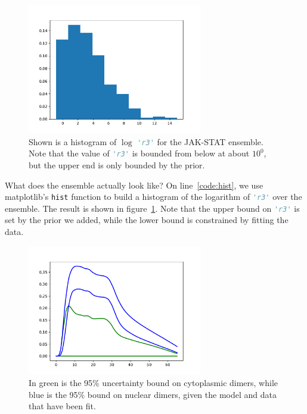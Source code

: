 \documentclass[12pt]{article}
\makeatletter
\newcommand{\py}[1]{\lstinline[language=Python, showstringspaces=False]@#1@}
\makeatother
\begin{document}
\begin{figure}
\begin{center}
\includegraphics[width=3in]{../../Example/JAK-STAT/hist}
\end{center}
\caption[Histogram of $\log$ \py{'r3'} for the JAK-STAT model]{Shown is a histogram of $\log$ \py{'r3'} for the JAK-STAT ensemble. Note that the value of \py{'r3'} is bounded from below at about $10^0$, but the upper end is only bounded by the prior.\label{fig:user:hist}}
\end{figure}

What does the ensemble actually look like?
On line~\ref{code:hist}, we use matplotlib's \py{hist} function to build a histogram of the logarithm of \py{'r3'} over the ensemble.
The result is shown in figure~\ref{fig:user:hist}.
Note that the upper bound on \py{'r3'} is set by the prior we added, while the lower bound is constrained by fitting the data.

\begin{figure}
\begin{center}
\includegraphics[width=3in]{../../Example/JAK-STAT/uncerts}
\end{center}
\caption[Prediction uncertainties for the JAK-STAT model]{In green is the 95\% uncertainty bound on cytoplasmic dimers, while blue is the 95\% bound on nuclear dimers, given the model and data that have been fit.\label{fig:user:uncerts}}
\end{figure}
\end{document}
